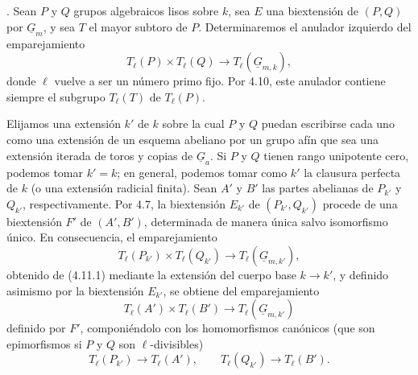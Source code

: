 

\medskip
{}. Sean $P$ y $Q$ grupos algebraicos lisos sobre $k$,
sea $E$ una biextensión de $(P,Q)$ por $\underline G_m$, y sea $T$ el
mayor subtoro de $P$. Determinaremos el anulador izquierdo del
emparejamiento
\begin{equation}\tag{4.11.1}
 T_\ell(P)\times T_\ell(Q)
 \longrightarrow T_\ell(\underline G_{m,k}),
\end{equation}
donde $\ell$ vuelve a ser un número primo fijo. Por 4.10, este anulador
contiene siempre el subgrupo $T_\ell(T)$ de $T_\ell(P)$.

Elijamos una extensión $k'$ de $k$ sobre la cual $P$ y $Q$ puedan
escribirse cada uno como una extensión de un esquema abeliano por un
grupo afín que sea una extensión iterada de toros y copias de
$\underline G_a$. Si $P$ y $Q$ tienen rango unipotente cero, podemos
tomar $k'=k$; en general, podemos tomar como $k'$ la clausura perfecta
de $k$ (o una extensión radicial finita). Sean $A'$ y $B'$ las partes
abelianas de $P_{k'}$ y $Q_{k'}$, respectivamente. Por 4.7, la
biextensión $E_{k'}$ de $(P_{k'},Q_{k'})$ procede de una biextensión
$F'$ de $(A',B')$, determinada de manera única salvo isomorfismo único.
En consecuencia, el emparejamiento
\begin{equation}\tag{4.11.2}
 T_\ell(P_{k'})\times T_\ell(Q_{k'})
 \longrightarrow T_\ell(\underline G_{m,k'}),
\end{equation}
obtenido de (4.11.1) mediante la extensión del cuerpo base $k\to k'$,
y definido asimismo por la biextensión $E_{k'}$, se obtiene del
emparejamiento
\begin{equation}\tag{4.11.3}
 T_\ell(A')\times T_\ell(B')
 \longrightarrow T_\ell(\underline G_{m,k'})
\end{equation}
definido por $F'$, componiéndolo con los homomorfismos canónicos (que
son epimorfismos si $P$ y $Q$ son $\ell$-divisibles)
\begin{equation}\tag{4.11.4}
 T_\ell(P_{k'})\longrightarrow T_\ell(A'),
 \qquad
 T_\ell(Q_{k'})\longrightarrow T_\ell(B').
\end{equation}


